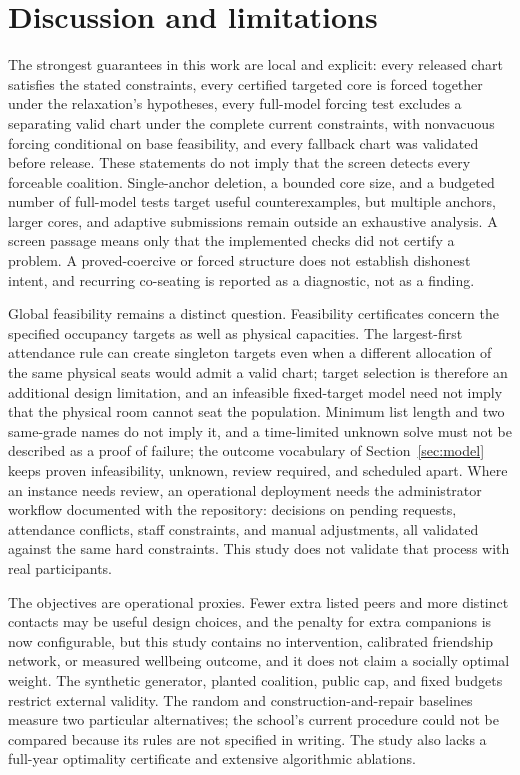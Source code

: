 \documentclass[11pt,a4paper]{article}
\theoremstyle{definition}\newtheorem{definition}[theorem]{Definition}
\theoremstyle{remark}\newtheorem{remark}[theorem]{Remark}
\begin{document}
\section{Discussion and limitations}
The strongest guarantees in this work are local and explicit: every released chart satisfies the stated constraints, every certified targeted core is forced together under the relaxation's hypotheses, every full-model forcing test excludes a separating valid chart under the complete current constraints, with nonvacuous forcing conditional on base feasibility, and every fallback chart was validated before release. These statements do not imply that the screen detects every forceable coalition. Single-anchor deletion, a bounded core size, and a budgeted number of full-model tests target useful counterexamples, but multiple anchors, larger cores, and adaptive submissions remain outside an exhaustive analysis. A screen passage means only that the implemented checks did not certify a problem. A proved-coercive or forced structure does not establish dishonest intent, and recurring co-seating is reported as a diagnostic, not as a finding.

Global feasibility remains a distinct question. Feasibility certificates concern the specified occupancy targets as well as physical capacities. The largest-first attendance rule can create singleton targets even when a different allocation of the same physical seats would admit a valid chart; target selection is therefore an additional design limitation, and an infeasible fixed-target model need not imply that the physical room cannot seat the population. Minimum list length and two same-grade names do not imply it, and a time-limited unknown solve must not be described as a proof of failure; the outcome vocabulary of Section~\ref{sec:model} keeps proven infeasibility, unknown, review required, and scheduled apart. Where an instance needs review, an operational deployment needs the administrator workflow documented with the repository: decisions on pending requests, attendance conflicts, staff constraints, and manual adjustments, all validated against the same hard constraints. This study does not validate that process with real participants.

The objectives are operational proxies. Fewer extra listed peers and more distinct contacts may be useful design choices, and the penalty for extra companions is now configurable, but this study contains no intervention, calibrated friendship network, or measured wellbeing outcome, and it does not claim a socially optimal weight. The synthetic generator, planted coalition, public cap, and fixed budgets restrict external validity. The random and construction-and-repair baselines measure two particular alternatives; the school's current procedure could not be compared because its rules are not specified in writing. The study also lacks a full-year optimality certificate and extensive algorithmic ablations.
\end{document}
